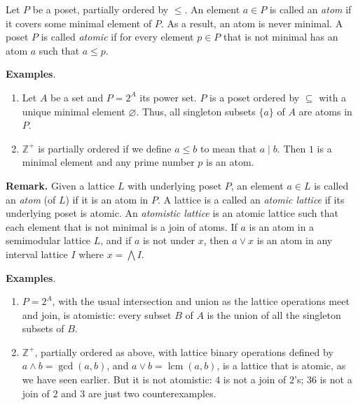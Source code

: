 \documentclass[12pt]{article}
\begin{document}
Let $P$ be a poset, partially ordered by $\leq$.  An element $a\in P$ is called an \emph{atom} if it covers some minimal element of $P$.  As a result, an atom is never minimal.  A poset $P$ is called \emph{atomic} if for every element $p\in P$ that is not minimal has an atom $a$ such that $a\leq p$.


\textbf{Examples}.
\begin{enumerate}
\item Let $A$ be a set and $P=2^A$ its power set.  $P$ is a poset ordered by $\subseteq$ with a unique minimal element $\varnothing$.  Thus, all singleton subsets $\lbrace a \rbrace$ of $A$ are atoms in $P$.
\item $\mathbb{Z}^+$ is partially ordered if we define $a\leq b$ to mean that $a\mid b$.  Then $1$ is a minimal element and any prime number $p$ is an atom.
\end{enumerate}

\textbf{Remark.} Given a lattice $L$ with underlying poset $P$, an element $a\in L$ is called an \emph{atom} (of $L$) if it is an atom in $P$.  A lattice is a called an \emph{atomic lattice} if its underlying poset is atomic.  An \emph{atomistic lattice} is an atomic lattice such that each element that is not minimal is a join of atoms.  If $a$ is an atom in a semimodular lattice $L$, and if $a$ is not under $x$, then $a\vee x$ is an atom in any interval lattice $I$ where $x=\bigwedge I$.

\textbf{Examples}.
\begin{enumerate}
\item $P=2^A$, with the usual intersection and union as the lattice operations meet and join, is atomistic: every subset $B$ of $A$ is the union of all the singleton subsets of $B$.
\item $\mathbb{Z}^+$, partially ordered as above, with lattice binary operations defined by $a\wedge b=\operatorname{gcd}(a,b)$, and $a\vee b= \operatorname{lcm}(a,b)$, is a lattice that is atomic, as we have seen earlier.  But it is not atomistic: $4$ is not a join of $2$'s; $36$ is not a join of $2$ and $3$ are just two counterexamples.
\end{enumerate}
\end{document}
